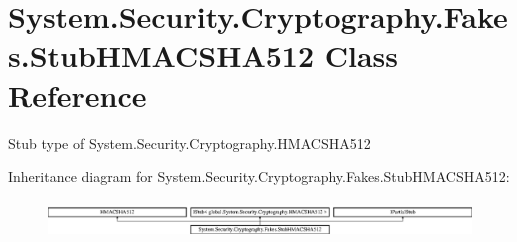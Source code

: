 \hypertarget{class_system_1_1_security_1_1_cryptography_1_1_fakes_1_1_stub_h_m_a_c_s_h_a512}{\section{System.\-Security.\-Cryptography.\-Fakes.\-Stub\-H\-M\-A\-C\-S\-H\-A512 Class Reference}
\label{class_system_1_1_security_1_1_cryptography_1_1_fakes_1_1_stub_h_m_a_c_s_h_a512}
}


Stub type of System.\-Security.\-Cryptography.\-H\-M\-A\-C\-S\-H\-A512 


Inheritance diagram for System.\-Security.\-Cryptography.\-Fakes.\-Stub\-H\-M\-A\-C\-S\-H\-A512\-:\begin{figure}[H]
\begin{center}
\leavevmode
\includegraphics[height=1.003584cm]{class_system_1_1_security_1_1_cryptography_1_1_fakes_1_1_stub_h_m_a_c_s_h_a512}
\end{center}
\end{figure}
